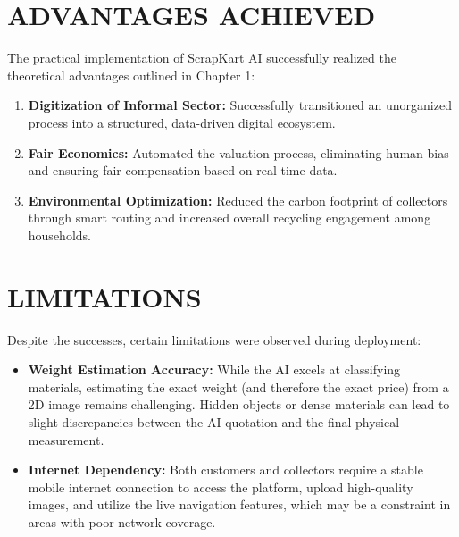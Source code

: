 \section{ADVANTAGES ACHIEVED}
The practical implementation of ScrapKart AI successfully realized the theoretical advantages outlined in Chapter 1:
\begin{enumerate}
    \item \textbf{Digitization of Informal Sector:} Successfully transitioned an unorganized process into a structured, data-driven digital ecosystem.
    \item \textbf{Fair Economics:} Automated the valuation process, eliminating human bias and ensuring fair compensation based on real-time data.
    \item \textbf{Environmental Optimization:} Reduced the carbon footprint of collectors through smart routing and increased overall recycling engagement among households.
\end{enumerate}

\section{LIMITATIONS}
Despite the successes, certain limitations were observed during deployment:
\begin{itemize}
    \item \textbf{Weight Estimation Accuracy:} While the AI excels at classifying materials, estimating the exact weight (and therefore the exact price) from a 2D image remains challenging. Hidden objects or dense materials can lead to slight discrepancies between the AI quotation and the final physical measurement.
    \item \textbf{Internet Dependency:} Both customers and collectors require a stable mobile internet connection to access the platform, upload high-quality images, and utilize the live navigation features, which may be a constraint in areas with poor network coverage.
\end{itemize}
